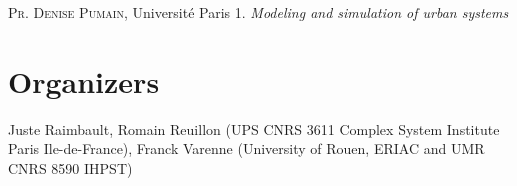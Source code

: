 \documentclass[11pt]{article}
\newcommand{\noun}[1]{\textsc{#1}}
\begin{document}
\noindent\noun{Pr. Denise Pumain}, Université Paris 1. \textit{Modeling and simulation of urban systems}





\section*{Organizers}

Juste Raimbault, Romain Reuillon (UPS CNRS 3611 Complex System Institute Paris Ile-de-France), Franck Varenne (University of Rouen, ERIAC and UMR CNRS 8590 IHPST)











%
%
\end{document}

